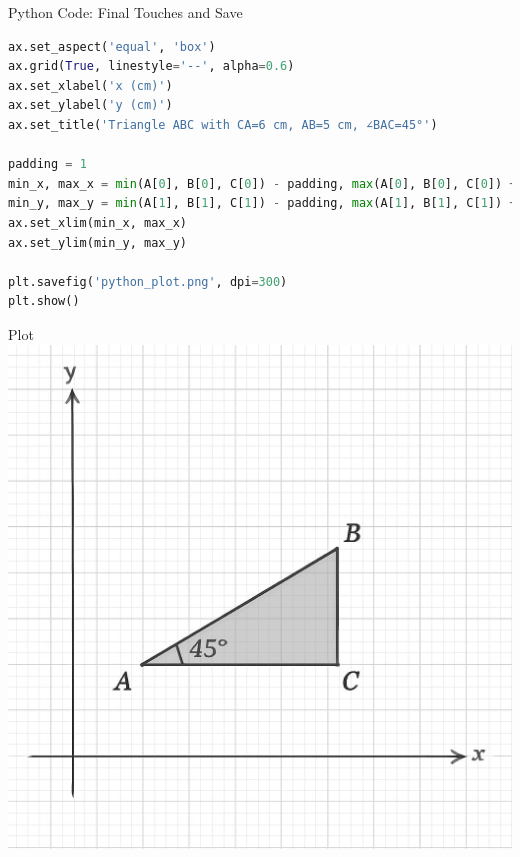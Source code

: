 \documentclass{beamer}
\begin{document}
\begin{frame}[fragile]{Python Code: Final Touches and Save}
\begin{lstlisting}[language=Python]
ax.set_aspect('equal', 'box')
ax.grid(True, linestyle='--', alpha=0.6)
ax.set_xlabel('x (cm)')
ax.set_ylabel('y (cm)')
ax.set_title('Triangle ABC with CA=6 cm, AB=5 cm, ∠BAC=45°')

padding = 1
min_x, max_x = min(A[0], B[0], C[0]) - padding, max(A[0], B[0], C[0]) + padding
min_y, max_y = min(A[1], B[1], C[1]) - padding, max(A[1], B[1], C[1]) + padding
ax.set_xlim(min_x, max_x)
ax.set_ylim(min_y, max_y)

plt.savefig('python_plot.png', dpi=300)
plt.show()
\end{lstlisting}
\end{frame}




\begin{frame}{Plot}
    \centering
    \includegraphics[width=\columnwidth, height=0.8\textheight, keepaspectratio]{figs/python_plot.png}     
\end{frame}
\end{document}
